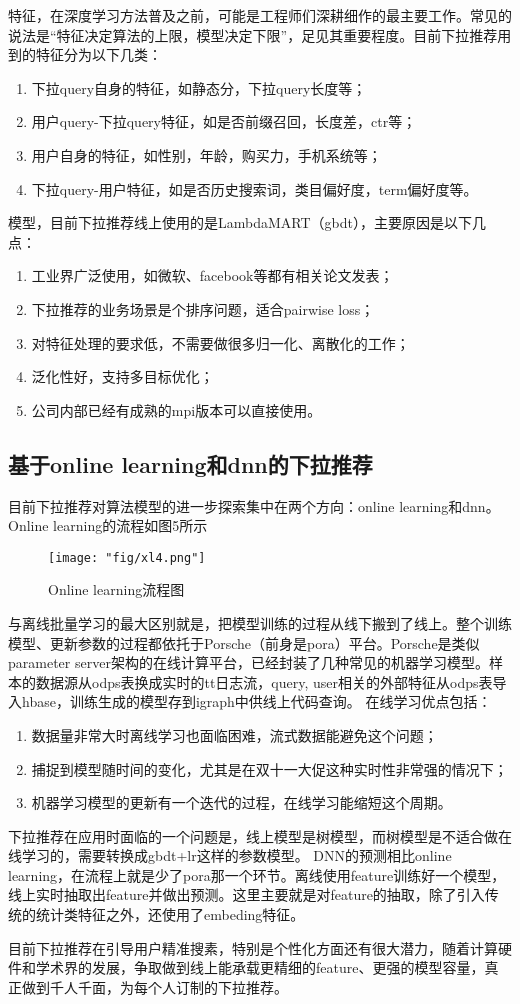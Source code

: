 特征，在深度学习方法普及之前，可能是工程师们深耕细作的最主要工作。常见的说法是“特征决定算法的上限，模型决定下限”，足见其重要程度。目前下拉推荐用到的特征分为以下几类：
\begin{enumerate}
\item 下拉query自身的特征，如静态分，下拉query长度等；
\item 用户query-下拉query特征，如是否前缀召回，长度差，ctr等；
\item 用户自身的特征，如性别，年龄，购买力，手机系统等；
\item 下拉query-用户特征，如是否历史搜索词，类目偏好度，term偏好度等。
\end{enumerate}

模型，目前下拉推荐线上使用的是LambdaMART（gbdt），主要原因是以下几点：
\begin{enumerate}
\item 工业界广泛使用，如微软、facebook等都有相关论文发表；
\item 下拉推荐的业务场景是个排序问题，适合pairwise loss；
\item 对特征处理的要求低，不需要做很多归一化、离散化的工作；
\item 泛化性好，支持多目标优化；	
\item 公司内部已经有成熟的mpi版本可以直接使用。
\end{enumerate}
\subsection{基于online learning和dnn的下拉推荐}
目前下拉推荐对算法模型的进一步探索集中在两个方向：online learning和dnn。
Online learning的流程如图5所示
\begin{figure}[!h]
	\centering
	\texttt{[image: "fig/xl4.png"]}
	\caption{Online learning流程图}
	\label{fig:xl4}
\end{figure}
与离线批量学习的最大区别就是，把模型训练的过程从线下搬到了线上。整个训练模型、更新参数的过程都依托于Porsche（前身是pora）平台。Porsche是类似parameter server架构的在线计算平台，已经封装了几种常见的机器学习模型。样本的数据源从odps表换成实时的tt日志流，query, user相关的外部特征从odps表导入hbase，训练生成的模型存到igraph中供线上代码查询。
在线学习优点包括：
\begin{enumerate}
\item 数据量非常大时离线学习也面临困难，流式数据能避免这个问题；
\item 捕捉到模型随时间的变化，尤其是在双十一大促这种实时性非常强的情况下；
\item 机器学习模型的更新有一个迭代的过程，在线学习能缩短这个周期。
\end{enumerate}
下拉推荐在应用时面临的一个问题是，线上模型是树模型，而树模型是不适合做在线学习的，需要转换成gbdt+lr这样的参数模型。
DNN的预测相比online learning，在流程上就是少了pora那一个环节。离线使用feature训练好一个模型，线上实时抽取出feature并做出预测。这里主要就是对feature的抽取，除了引入传统的统计类特征之外，还使用了embeding特征。
\par 目前下拉推荐在引导用户精准搜素，特别是个性化方面还有很大潜力，随着计算硬件和学术界的发展，争取做到线上能承载更精细的feature、更强的模型容量，真正做到千人千面，为每个人订制的下拉推荐。


